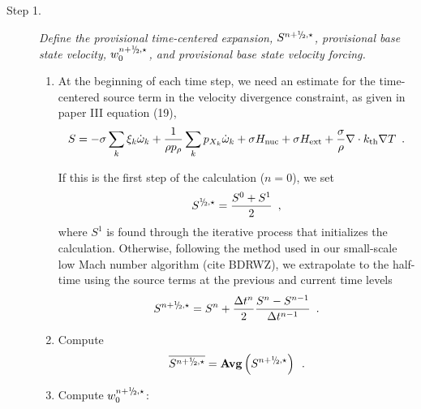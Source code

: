 \begin{description}

\item[Step 1.] {\em Define the provisional time-centered expansion, $S^{n+\myhalf,\star}$, 
provisional base state velocity, $w_0^{n+\myhalf,\star}$, and provisional base state velocity 
forcing.}

\begin{enumerate}
\renewcommand{\theenumi}{{\bf \alph{enumi}}}

\item At the beginning of each time step, we need an estimate for the time-centered
source term in the velocity divergence constraint, as given in paper III equation (19),
\begin{equation}
  S =  -\sigma  \sum_k  \xi_k \dot{\omega}_k  + 
  \frac{1}{\rho p_\rho} \sum_k p_{X_k}  {\dot{\omega}}_k  + \sigma {H_{\rm nuc}} + \sigma {H_{\rm ext}} 
  + \frac{\sigma}{\rho}\nabla\cdot k_{\rm th}\nabla T \enskip .
\label{eq:defineS} 
\end{equation}

If this is the first step of the calculation ($n=0$), we set
\begin{equation}
S^{\myhalf,\star} = \frac{S^0 + S^1}{2} \enskip ,
\end{equation}
where $S^1$ is found through the iterative process that initializes the calculation.
Otherwise, following the method used in our small-scale low Mach number algorithm
(cite BDRWZ), we extrapolate to the half-time using the source
terms at the previous and current time levels
\begin{equation}
S^{\nph,\star} = S^n + \frac{\Delta t^n}{2} \frac{S^n - S^{n-1}}{\Delta t^{n-1}} \enskip .
\end{equation}
\item Compute
\begin{equation}
\overline{S^{\nph,\star}} = {\mathrm{\bf Avg}} \left(S^{\nph,\star}\right) \enskip .
\end{equation}
\item Compute $w_0^{n+\myhalf,\star}$:


\end{enumerate}
\end{description}
